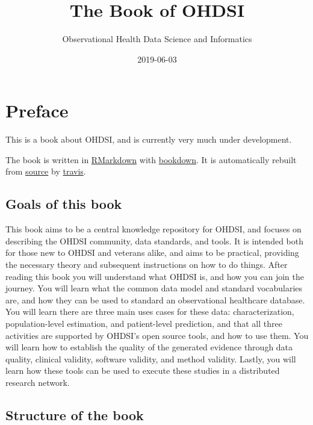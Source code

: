 \documentclass[]{book}
\title{The Book of OHDSI}
\author{Observational Health Data Science and Informatics}
\date{2019-06-03}
\begin{document}
\maketitle

{
\setcounter{tocdepth}{1}
\tableofcontents
}
\chapter*{Preface}\label{preface}

 This is a book about OHDSI, and is currently very much under
development.

The book is written in \href{https://rmarkdown.rstudio.com}{RMarkdown}
with \href{https://bookdown.org}{bookdown}. It is automatically rebuilt
from \href{https://github.com/OHDSI/TheBookOfOhdsi}{source} by
\href{http://travis-ci.org/}{travis}.

\section*{Goals of this book}\label{goals-of-this-book}

This book aims to be a central knowledge repository for OHDSI, and
focuses on describing the OHDSI community, data standards, and tools. It
is intended both for those new to OHDSI and veterans alike, and aims to
be practical, providing the necessary theory and subsequent instructions
on how to do things. After reading this book you will understand what
OHDSI is, and how you can join the journey. You will learn what the
common data model and standard vocabularies are, and how they can be
used to standard an observational healthcare database. You will learn
there are three main uses cases for these data: characterization,
population-level estimation, and patient-level prediction, and that all
three activities are supported by OHDSI's open source tools, and how to
use them. You will learn how to establish the quality of the generated
evidence through data quality, clinical validity, software validity, and
method validity. Lastly, you will learn how these tools can be used to
execute these studies in a distributed research network.

\section*{Structure of the book}\label{structure-of-the-book}
\end{document}
